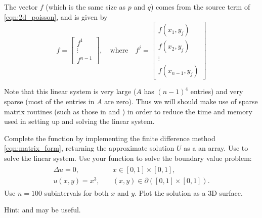 The vector $f$ (which is the same size as $p$ and $q$) comes from the source term of \eqref{eqn:2d_poisson}, and is given by
\[f = \begin{bmatrix} f^1 \\ \vdots \\ f^{n-1} \end{bmatrix}, \quad  \text{where} \quad f^j = \begin{bmatrix} f(x_1,y_j) \\ f(x_2,y_j) \\ \vdots \\ f(x_{n-1},y_j) \end{bmatrix}\]

Note that this linear system is very large ($A$ has $(n-1)^4$ entries) and very sparse (most of the entries in $A$ are zero).
Thus we will should make use of sparse matrix routines (such as those in  and ) in order to reduce the time and memory used in setting up and solving the linear system.

\begin{problem}
Complete the function  by implementing the finite difference method \eqref{eqn:matrix_form}, returning the approximate solution $U$ as a an array.
Use  to solve the linear system.
Use your function to solve the boundary value problem:
\begin{align}
	\begin{split}
	\Delta u = 0, &{}\quad x \in [0,1]\times [0,1],\\
	u(x,y) = x^3, &{}\quad (x,y) \in \partial ([0,1]\times [0,1]).
	\end{split}
	\label{poisson2d:laplace}
\end{align}
Use $n=100$ subintervals for both $x$ and $y$.
Plot the solution as a 3D surface.

Hint:  and  may be useful.
\label{poisson:prob:poisson_square}
\end{problem}

